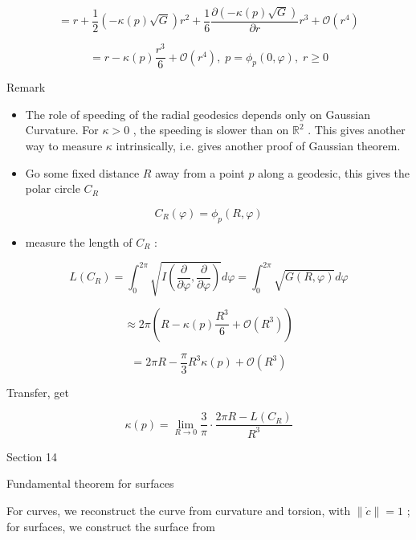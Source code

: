 \documentclass[lang=cn,a4paper,11pt,openany,twoside]{elegantbook}
\begin{document}
\[
= r + \frac{1}{2}\left( {-\kappa \left( p\right) \sqrt{G}}\right) {r}^{2} + \frac{1}{6}\frac{\partial \left( {-\kappa \left( p\right) \sqrt{G}}\right) }{\partial r}{r}^{3} + \mathcal{O}\left( {r}^{4}\right)
\]

\[
= r - \kappa \left( p\right) \frac{{r}^{3}}{6} + \mathcal{O}\left( {r}^{4}\right) ,\;p = {\phi }_{p}\left( {0,\varphi }\right) ,\;r \geq  0
\]

Remark

\begin{itemize}\relax
\item\relax The role of speeding of the radial geodesics depends only on Gaussian Curvature. For \(\kappa  > 0\) , the speeding is slower than on \({\mathbb{R}}^{2}\) . This gives another way to measure \(\kappa\) intrinsically, i.e. gives another proof of Gaussian theorem.
\end{itemize}

\begin{itemize}\relax
\item\relax Go some fixed distance \(R\) away from a point \(p\) along a geodesic, this gives the polar circle \({C}_{R}\)
\end{itemize}

\[
{C}_{R}\left( \varphi \right)  = {\phi }_{p}\left( {R,\varphi }\right)
\]

\begin{itemize}\relax
\item\relax measure the length of \({C}_{R}\) :
\end{itemize}

\[
L\left( {C}_{R}\right)  = {\int }_{0}^{2\pi }\sqrt{I\left( {\frac{\partial }{\partial \varphi },\frac{\partial }{\partial \varphi }}\right) }{d\varphi } = {\int }_{0}^{2\pi }\sqrt{G\left( {R,\varphi }\right) }{d\varphi }
\]

\[
\approx  {2\pi }\left( {R - \kappa \left( p\right) \frac{{R}^{3}}{6} + \mathcal{O}\left( {R}^{3}\right) }\right)
\]

\[
= {2\pi R} - \frac{\pi }{3}{R}^{3}\kappa \left( p\right)  + \mathcal{O}\left( {R}^{3}\right)
\]

Transfer, get

\[
\kappa \left( p\right)  = \mathop{\lim }\limits_{{R \rightarrow  0}}\frac{3}{\pi } \cdot  \frac{{2\pi R} - L\left( {C}_{R}\right) }{{R}^{3}}
\]

Section 14

Fundamental theorem for surfaces

For curves, we reconstruct the curve from curvature and torsion, with \(\parallel \dot{c}\parallel  = 1\) ; for surfaces, we construct the surface from
\end{document}
